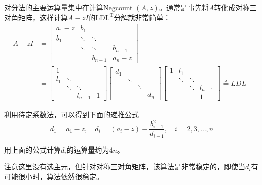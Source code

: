 \documentclass[12pt,a4paper]{article}
\begin{document}
对分法的主要运算量集中在计算Negcount $(A, z)$。通常是事先将$A$转化成对称三对角矩阵，这样计算$A-z I$的$\mathrm{LDL}^{\mathrm{T}}$分解就非常简单：
\begin{equation*}
\begin{aligned}
A-z I&=\left[\begin{array}{cccc}{a_{1}-z} & {b_{1}} & {} & {} \\ {b_{1}} & {\ddots} & {\ddots} & {} \\ {} & {\ddots} & {\ddots} & {b_{n-1}} \\ {} & {} & {b_{n-1}} & {a_{n}-z}\end{array}\right]
\\
&=\left[\begin{array}{cccc}{1} \\ {l_{1}} & {\ddots} & {} & {} \\ {} & {\ddots} & {\ddots} & {} \\ {} & {} & {l_{n-1}} & {1}\end{array}\right]\left[\begin{array}{cccc}{d_{1}} & {} & {}&  \\ {} & {\ddots} & {} & {} \\ {}  & {} & {\ddots} & {} \\ {} & {} & {}  & {d_{n}}\end{array}\right] \left[\begin{array}{cccc}{1} & {l_{1}} & {} & {} \\ {} & {\ddots} & {\ddots} & {}  \\ {} & {} & {\ddots} & {l_{n-1}} \\ {} & {} & {} & {1}\end{array}\right] \triangleq L D L^{\top}
\end{aligned}
\end{equation*}

利用待定系数法，可以得到下面的递推公式
\begin{equation}
d_{1}=a_{1}-z, \quad d_{i}=\left(a_{i}-z\right)-\frac{b_{i-1}^{2}}{d_{i-1}}, \quad i=2,3, \ldots, n
\label{equation5.7}
\end{equation}

用上面的公式计算$d_i$的运算量约为$4n$。

注意这里没有选主元，但针对对称三对角矩阵，该算法是非常稳定的，即使当$d_i$有可能很小时，算法依然很稳定。
\end{document}
